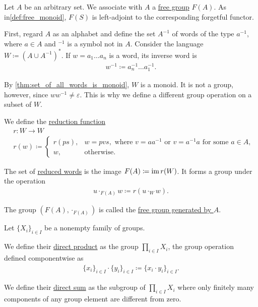 \begin{definition}\label{def:free_group}\cite[306]{Knapp2016BAlg}
  Let $A$ be an arbitrary set. We associate with $A$ a \uline{free group} $F(A)$. As in\cref{def:free_monoid}, $F(S)$ is left-adjoint to the corresponding forgetful functor.

  First, regard $A$ as an alphabet and define the set $A^{-1}$ of words of the type $a^{-1}$, where $a \in A$ and $\mbox{}^{-1}$ is a symbol not in $A$. Consider the language $W \coloneqq (A \cup A^{-1})^{*}$. If $w = a_1 \ldots a_n$ is a word, its inverse word is
  \begin{align*}
    w^{-1} \coloneqq a_n^{-1} \ldots a_1^{-1}.
  \end{align*}

  By \cref{thm:set_of_all_words_is_monoid}, $W$ is a monoid. It is not a group, however, since $w w^{-1} \neq \varepsilon$. This is why we define a different group operation on a subset of $W$.

  We define the \uline{reduction function}
  \begin{align*}
    &r: W \to W \\
    &r(w) \coloneqq \begin{cases}
      r(ps), &w = pvs, \text{ where } v = aa^{-1} \text{ or } v = a^{-1}a \text{ for some } a \in A, \\
      w, &\text{otherwise}.
    \end{cases}
  \end{align*}

  The set of \uline{reduced words} is the image $F(A) \coloneqq \operatorname{im} r(W)$. It forms a group under the operation
  \begin{align*}
    u \cdot_{F(A)} w \coloneqq r(u \cdot_{W} w).
  \end{align*}

  The group $(F(A), \cdot_{F(A)})$ is called the \uline{free group generated by $A$}.
\end{definition}

\begin{definition}\label{def:group_direct_product}
  Let $\{ X_i \}_{i \in I}$ be a nonempty family of groups.

  We define their \uline{direct product} as the group $\prod_{i \in I} X_i$, the group operation defined componentwise as
  \begin{align*}
    \{ x_i \}_{i \in I} \cdot \{ y_i \}_{i \in I}
    \coloneqq
    \{ x_i \cdot y_i \}_{i \in I}.
  \end{align*}

  We define their \uline{direct sum} as the subgroup of $\prod_{i \in I} X_i$ where only finitely many components of any group element are different from zero.
\end{definition}

